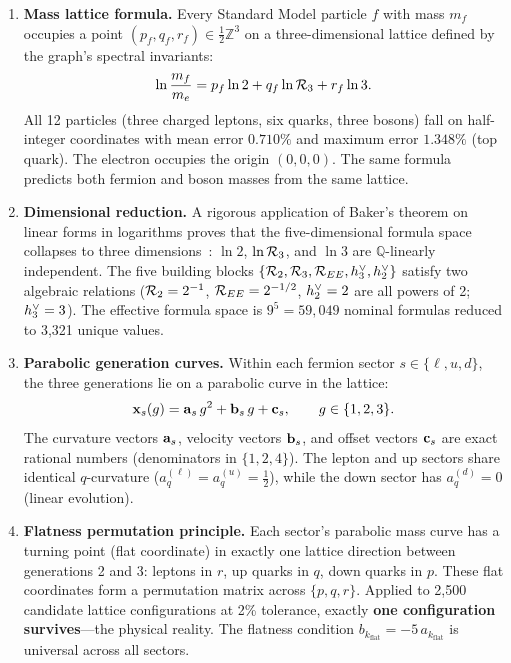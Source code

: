 \begin{enumerate}[label=\arabic*.]

\item \textbf{Mass lattice formula.} Every Standard Model particle $f$ with mass $m_f$ occupies a point $(p_f, q_f, r_f) \in \frac{1}{2}\mathbb{Z}^3$ on a three-dimensional lattice defined by the graph's spectral invariants:
\begin{equation}
\ln\frac{m_f}{m_e} = p_f \ln 2 + q_f \ln\mathcal{R}_3 + r_f \ln 3.
\end{equation}
All 12 particles (three charged leptons, six quarks, three bosons) fall on half-integer coordinates with mean error $0.710\%$ and maximum error $1.348\%$ (top quark). The electron occupies the origin $(0,0,0)$. The same formula predicts both fermion and boson masses from the same lattice.

\item \textbf{Dimensional reduction.} A rigorous application of Baker's theorem on linear forms in logarithms proves that the five-dimensional formula space collapses to three dimensions~\cite{baker1966linear}: $\ln 2$, $\ln\mathcal{R}_3$, and $\ln 3$ are $\mathbb{Q}$-linearly independent. The five building blocks $\{\mathcal{R}_2, \mathcal{R}_3, \mathcal{R}_{EE}, h^\vee_3, h^\vee_2\}$ satisfy two algebraic relations ($\mathcal{R}_2 = 2^{-1}$, $\mathcal{R}_{EE} = 2^{-1/2}$, $h^\vee_2 = 2$ are all powers of 2; $h^\vee_3 = 3$). The effective formula space is $9^5 = 59{,}049$ nominal formulas reduced to 3,321 unique values.

\item \textbf{Parabolic generation curves.} Within each fermion sector $s \in \{\ell, u, d\}$, the three generations lie on a parabolic curve in the lattice:
\begin{equation}
\mathbf{x}_s(g) = \mathbf{a}_s \, g^2 + \mathbf{b}_s \, g + \mathbf{c}_s, \qquad g \in \{1, 2, 3\}.
\end{equation}
The curvature vectors $\mathbf{a}_s$, velocity vectors $\mathbf{b}_s$, and offset vectors $\mathbf{c}_s$ are exact rational numbers (denominators in $\{1, 2, 4\}$). The lepton and up sectors share identical $q$-curvature ($a_q^{(\ell)} = a_q^{(u)} = \frac{1}{2}$), while the down sector has $a_q^{(d)} = 0$ (linear evolution).

\item \textbf{Flatness permutation principle.} Each sector's parabolic mass curve has a turning point (flat coordinate) in exactly one lattice direction between generations 2 and 3: leptons in $r$, up quarks in $q$, down quarks in $p$. These flat coordinates form a permutation matrix across $\{p, q, r\}$. Applied to 2,500 candidate lattice configurations at 2\% tolerance, exactly \textbf{one configuration survives}---the physical reality. The flatness condition $b_{k_{\mathrm{flat}}} = -5\,a_{k_{\mathrm{flat}}}$ is universal across all sectors.


\end{enumerate}
